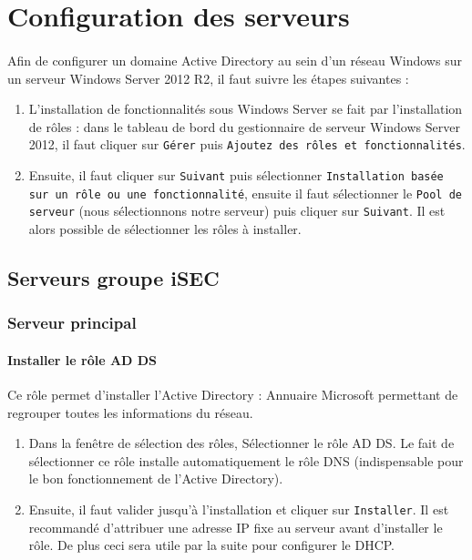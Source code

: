 \section{Configuration des serveurs}

	\paragraph{}
		Afin de configurer un domaine Active Directory au sein d’un réseau Windows sur un serveur Windows Server 2012 R2, il faut suivre les étapes suivantes :
	\begin{enumerate}
		\item L’installation de fonctionnalités sous Windows Server se fait par l’installation de rôles : dans le tableau de bord du gestionnaire de serveur Windows Server 2012, il faut cliquer sur \texttt{Gérer} puis \texttt{Ajoutez des rôles et fonctionnalités}. 
		\item Ensuite, il faut cliquer sur \texttt{Suivant} puis sélectionner \texttt{Installation basée sur un rôle ou une fonctionnalité}, ensuite il faut sélectionner le \texttt{Pool de serveur} (nous sélectionnons notre serveur) puis cliquer sur \texttt{Suivant}. Il est alors possible de sélectionner les rôles à installer.
	\end{enumerate}


	\subsection{Serveurs groupe iSEC}	
		\subsubsection{Serveur principal}
			\paragraph{Installer le rôle AD DS}
				Ce rôle permet d’installer l’Active Directory : Annuaire Microsoft permettant de regrouper toutes les informations du réseau. 
				\begin{enumerate}
					\item Dans la fenêtre de sélection des rôles, Sélectionner le rôle AD DS. Le fait de sélectionner ce rôle installe automatiquement le rôle DNS (indispensable pour le bon fonctionnement de l’Active Directory).

					\item Ensuite, il faut valider jusqu’à l’installation et cliquer sur \texttt{Installer}. Il est recommandé d’attribuer une adresse IP fixe au serveur avant d’installer le rôle. De plus ceci sera utile par la suite pour configurer le DHCP.
				\end{enumerate}

